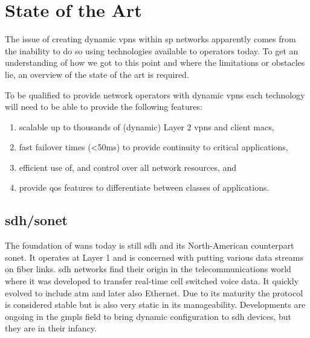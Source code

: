 \section{State of the Art} %
\label{sec:state_of_the_art}

The issue of creating dynamic \acp{vpn} within \ac{sp} networks apparently comes from the inability to do so using technologies available to operators today. To get an understanding of how we got to this point and where the limitations or obstacles lie, an overview of the state of the art is required.

To be qualified to provide network operators with dynamic \acp{vpn} each technology will need to be able to provide the following features:

\begin{enumerate}
	\item scalable up to thousands of (dynamic) Layer 2 \acp{vpn} and client \acsp{mac},
	\item fast failover times (<50ms) to provide continuity to critical applications,
	\item efficient use of, and control over all network resources, and
	\item provide \acl{qos} features to differentiate between classes of applications. 
\end{enumerate}

\subsection{\acs{sdh}/\acs{sonet}} %
\label{sub:sdh_sonet}
The foundation of \acp{wan} today is still \ac{sdh} and its North-American counterpart \ac{sonet}. It operates at Layer 1 and is concerned with putting various data streams on fiber links. \ac{sdh} networks find their origin in the telecommunications world where it was developed to transfer real-time cell switched voice data. It quickly evolved to include \ac{atm} and later also Ethernet. Due to its maturity the protocol is considered stable but is also very static in its manageability. Developments are ongoing in the \ac{gmpls} field to bring dynamic configuration to \ac{sdh} devices, but they are in their infancy.


